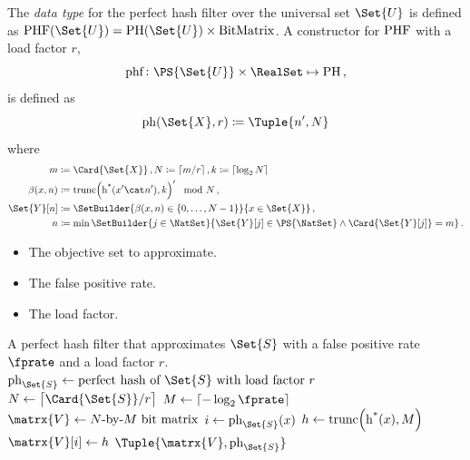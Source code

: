 \documentclass[ ../main.tex]{subfiles}
\begin{document}
The \emph{data type} for the perfect hash filter over the universal set $\Set{U}$ is defined as $\PHF(\Set{U}) = \PH(\Set{U}) \times \BitMatrix$.
A constructor for $\operatorname{PHF}$ with a load factor $r$,
\begin{equation}
\phf \colon \PS{\Set{U}} \times \RealSet \mapsto \PH\,,
\end{equation}
is defined as
\begin{equation}
\ph(\Set{X}, r) \coloneqq \Tuple{n',N}
\end{equation}
where
\begin{equation}
\begin{split}
m			& \coloneqq \Card{\Set{X}}\,, N \coloneqq \lceil m / r \rceil\,,k \coloneqq \lceil\log_2 N\rceil\\
\beta(x,n) 	& \coloneqq \trunc\!\left(\ro(x' \cat n'),k\right)' \mod N\,,\\
\Set{Y}[n] 	& \coloneqq \SetBuilder{\beta(x,n) \in \{0,\ldots,N-1\}}{x \in
	\Set{X}}\,,\\
n 			& \coloneqq \min{\SetBuilder{ j \in \NatSet }{ \Set{Y}[j] \in \PS{\NatSet} \land \Card{\Set{Y}[j]} = m}}\,.
\end{split}
\end{equation}



\begin{algorithm}[h]
    \label{alg:PHF}
    \KwIn
    {
        \begin{itemize}
            \item[$\Set{S}$] The objective set to approximate.
            \item[$\fprate$] The false positive rate.
            \item[$r$] The load factor.
        \end{itemize}
    }
    \KwOut
    {
        A perfect hash filter that approximates $\Set{S}$ with a false positive rate $\fprate$ and a load factor $r$.
    }
    {
        $\ph_{\Set{S}} \gets \text{perfect hash of $\Set{S}$ with load factor $r$}$\;
        $N \gets \left\lceil \Card{\Set{S}} / r \right\rceil$\;
        $M \gets \left\lceil -\log_2 \fprate \right\rceil$\;
        $\matrx{V} \gets N\text{-by-}M\text{ bit matrix}$\;
        {
            $i \gets \ph_{\Set{S}}(x)$\;
            $h \gets \operatorname{trunc}\!\left(\operatorname{h^*}(x), M\right)$\;
            $\matrx{V}[i] \gets h$\;
        }
        \Return $\Tuple{\matrx{V}, \ph_{\Set{S}}}$\;
    }
\end{algorithm}
\end{document}
